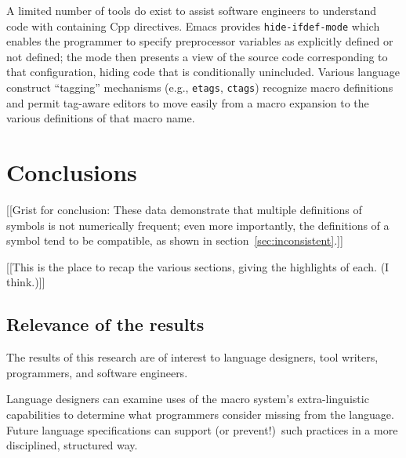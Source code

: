 \documentclass[10pt]{article}
\begin{document}

A limited number of tools do exist to assist software engineers to
understand code with containing Cpp directives.  Emacs provides
\texttt{hide-ifdef-mode} which enables the programmer to specify
preprocessor variables as explicitly defined or not defined; the mode
then presents a view of the source code corresponding to that
configuration, hiding code that is conditionally unincluded.  Various
language construct ``tagging'' mechanisms (e.g., \texttt{etags},
\texttt{ctags}) recognize macro definitions and permit tag-aware editors
to move easily from a macro expansion to the various definitions of
that macro name.


\section{Conclusions}
\label{sec:conclusion}

[[Grist for conclusion: These data demonstrate that multiple definitions of
symbols is not numerically frequent; even more importantly, the definitions
of a symbol tend to be compatible, as shown in
section~\ref{sec:inconsistent}.]]


[[This is the place to recap the various sections, giving the highlights of
each.  (I think.)]]

\subsection{Relevance of the results}

The results of this research are of interest to language designers, tool
writers, programmers, and software engineers.

Language designers can examine uses of the macro system's extra-linguistic
capabilities to determine what programmers consider missing from the
language.  Future language specifications can support (or prevent!)\ such
practices in a more disciplined, structured way.

\end{document}
